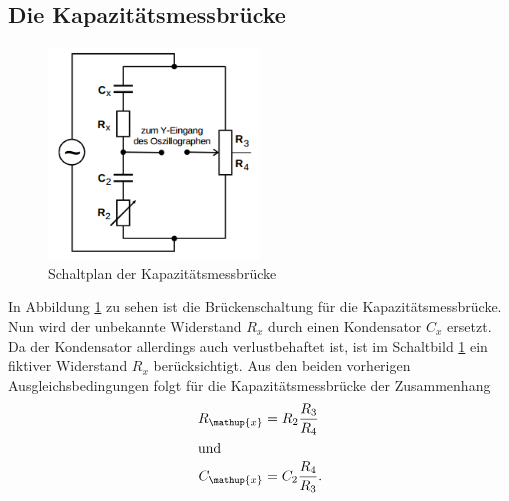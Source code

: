 \documentclass[
  bibliography=totoc,     %
  captions=tableheading,  %
  titlepage=firstiscover, %
]{scrartcl}
\begin{document}
\subsection{Die Kapazitätsmessbrücke}
\begin{figure}[htb]
  \centering
  \includegraphics[width=0.5\textwidth]{V3023.png}
  \caption{Schaltplan der Kapazitätsmessbrücke}
  \label{fig:V3023}
\end{figure}
In Abbildung \ref{fig:V3023} zu sehen ist die Brückenschaltung für die
Kapazitätsmessbrücke. Nun wird der unbekannte Widerstand $R_x$ durch einen
Kondensator $C_x$ ersetzt. Da der Kondensator allerdings auch verlustbehaftet
ist, ist im Schaltbild \ref{fig:V3023} ein fiktiver Widerstand $R_x$
berücksichtigt. Aus den beiden vorherigen Ausgleichsbedingungen folgt für
die Kapazitätsmessbrücke der Zusammenhang
\begin{align}
    \label{eq:kapazitätsmessbrücke_R}
    R_{\mathup{x}} &= R_2 \frac{R_3}{R_4} \\
    \shortintertext{und}
    \label{eq:kapazitätsmessbrücke_C}
    C_{\mathup{x}} &= C_2 \frac{R_4}{R_3}.
\end{align}

\newpage
\end{document}
